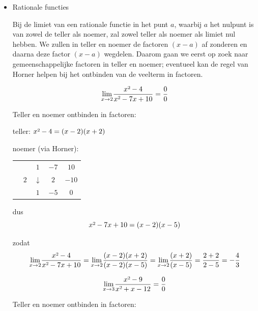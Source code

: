 \begin{itemize}
\item{Rationale functies}

Bij de limiet van een rationale functie in het punt $a$, waarbij
$a$ het nulpunt is van zowel de teller als noemer, zal zowel teller
als noemer als limiet nul hebben. We zullen in teller en noemer de
factoren $(x-a)$ af zonderen en daarna deze factor $(x-a)$ wegdelen.
Daarom gaan we eerst op zoek naar gemeenschappelijke factoren in teller
en noemer; eventueel kan de regel van Horner helpen bij het ontbinden
van de veelterm in factoren.


\begin{voorbeeld}
\begin{equation*}
{\displaystyle {\displaystyle \lim_{x\to2}}\frac{x\text{\texttwosuperior}-4}{x\text{\texttwosuperior}-7x+10}=\frac{0}{0}}
\end{equation*}

Teller en noemer ontbinden in factoren:

teller: $x\text{\texttwosuperior}-4=(x-2)(x+2)$

noemer (via Horner): %
\begin{tabular}{cc|ccc}
	&  & $1$ & $-7$ & $10$\\
	& $2$ & $\downarrow$ & $2$ & $-10$\\
	\cline{2-5} 
	&  & $1$ & \multicolumn{1}{c||}{$-5$} & $0$\\
\end{tabular}

dus \begin{equation*}
x\text{\texttwosuperior}-7x+10=(x-2)(x-5)
\end{equation*}

zodat \begin{equation*}
{\displaystyle {\displaystyle \lim_{x\to2}}\frac{x\text{\texttwosuperior}-4}{x\text{\texttwosuperior}-7x+10}={\displaystyle \lim_{x\to2}}\frac{(x-2)(x+2)}{(x-2)(x-5)}={\displaystyle \lim_{x\to2}}\frac{(x+2)}{(x-5)}=\frac{2+2}{2-5}=-\frac{4}{3}}
\end{equation*}
\end{voorbeeld}


\begin{voorbeeld}
	\begin{equation*}
{\displaystyle {\displaystyle \lim_{x\to3}}\frac{x\text{\texttwosuperior}-9}{x\text{\texttwosuperior}+x-12}=\frac{0}{0}}
\end{equation*}

Teller en noemer ontbinden in factoren:


\end{voorbeeld}
\end{itemize}
